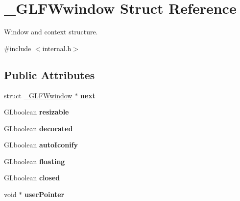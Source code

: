 \hypertarget{struct__GLFWwindow}{}\section{\+\_\+\+G\+L\+F\+Wwindow Struct Reference}
\label{struct__GLFWwindow}


Window and context structure.  




{\ttfamily \#include $<$internal.\+h$>$}

\subsection*{Public Attributes}
\begin{DoxyCompactItemize}
\item 
\hypertarget{struct__GLFWwindow_a674e806bf860fcda279cae810be554c3}{}struct \hyperlink{struct__GLFWwindow}{\+\_\+\+G\+L\+F\+Wwindow} $\ast$ {\bfseries next}\label{struct__GLFWwindow_a674e806bf860fcda279cae810be554c3}

\item 
\hypertarget{struct__GLFWwindow_acec6fcd56126dd56e00d14fd104ccf89}{}G\+Lboolean {\bfseries resizable}\label{struct__GLFWwindow_acec6fcd56126dd56e00d14fd104ccf89}

\item 
\hypertarget{struct__GLFWwindow_a7b54f5dbcc28fc4f9ea408cc52a8937a}{}G\+Lboolean {\bfseries decorated}\label{struct__GLFWwindow_a7b54f5dbcc28fc4f9ea408cc52a8937a}

\item 
\hypertarget{struct__GLFWwindow_a67d51bd54983ff4350f34e6a12c26c6f}{}G\+Lboolean {\bfseries auto\+Iconify}\label{struct__GLFWwindow_a67d51bd54983ff4350f34e6a12c26c6f}

\item 
\hypertarget{struct__GLFWwindow_a42992f7ae37e47fb2da73270debed833}{}G\+Lboolean {\bfseries floating}\label{struct__GLFWwindow_a42992f7ae37e47fb2da73270debed833}

\item 
\hypertarget{struct__GLFWwindow_a07c95af336c3fc1c4e57a25ea252fe09}{}G\+Lboolean {\bfseries closed}\label{struct__GLFWwindow_a07c95af336c3fc1c4e57a25ea252fe09}

\item 
\hypertarget{struct__GLFWwindow_ad04a9c0d5b0fd2146d1fd8b2ac99c120}{}void $\ast$ {\bfseries user\+Pointer}\label{struct__GLFWwindow_ad04a9c0d5b0fd2146d1fd8b2ac99c120}


\end{DoxyCompactItemize}
